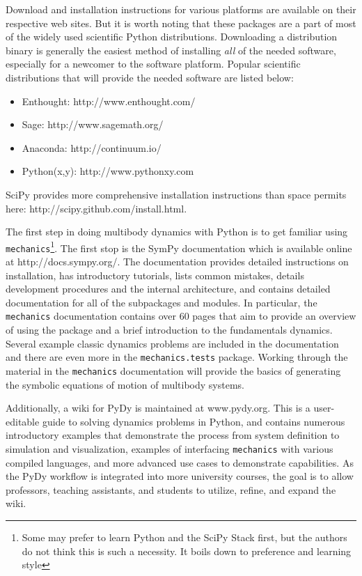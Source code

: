 \documentclass[twocolumn,10pt]{asme2e}
\begin{document}
Download and installation instructions for various platforms are available on
their respective web sites. But it is worth noting that these packages are a
part of most of the widely used scientific Python distributions. Downloading a
distribution binary is generally the easiest method of installing \emph{all} of
the needed software, especially for a newcomer to the software platform.
Popular scientific distributions that will provide the needed software are
listed below:
%
\begin{itemize}
  \item Enthought: http://www.enthought.com/
  \item Sage: http://www.sagemath.org/
  \item Anaconda: http://continuum.io/
  \item Python(x,y): http://www.pythonxy.com
\end{itemize}

SciPy provides more comprehensive installation instructions than space permits
here: http://scipy.github.com/install.html.

The first step in doing multibody dynamics with Python is to get familiar using
\verb|mechanics|\footnote{Some may prefer to learn Python and the SciPy Stack
first, but the authors do not think this is such a necessity. It boils down to
preference and learning style}. The first stop is the SymPy documentation which
is available online at http://docs.sympy.org/. The documentation provides
detailed instructions on installation, has introductory tutorials, lists common
mistakes, details development procedures and the internal architecture, and
contains detailed documentation for all of the subpackages and modules. In
particular, the \verb|mechanics| documentation contains over 60 pages that aim
to provide an overview of using the package and a brief introduction to the
fundamentals dynamics. Several example classic dynamics problems are included
in the documentation and there are even more in the \verb|mechanics.tests|
package. Working through the material in the \verb|mechanics| documentation
will provide the basics of generating the symbolic equations of motion of
multibody systems.

Additionally, a wiki for PyDy is maintained at www.pydy.org. This is a
user-editable guide to solving dynamics problems in Python, and contains
numerous introductory examples that demonstrate the process from system
definition to simulation and visualization, examples of interfacing
\verb|mechanics| with various compiled languages, and more advanced use cases
to demonstrate capabilities. As the PyDy workflow is integrated into more
university courses, the goal is to allow professors, teaching assistants, and
students to utilize, refine, and expand the wiki.
\end{document}
